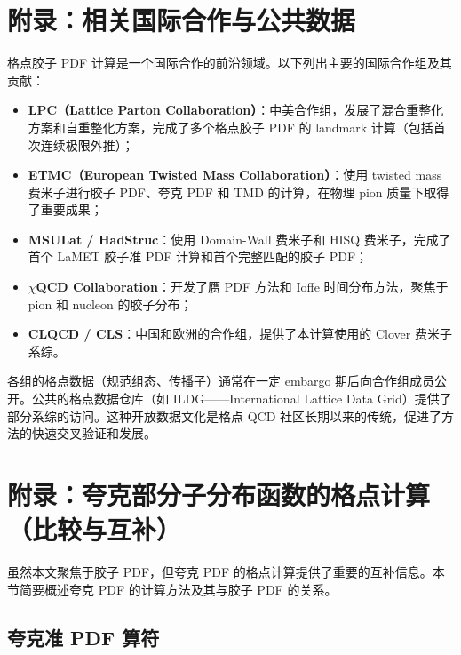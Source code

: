 \documentclass[11pt,a4paper]{ctexart}
\begin{document}
\section{附录：相关国际合作与公共数据}

格点胶子 PDF 计算是一个国际合作的前沿领域。以下列出主要的国际合作组及其贡献：

\begin{itemize}
  \item \textbf{LPC（Lattice Parton Collaboration）}：中美合作组，发展了混合重整化方案和自重整化方案，完成了多个格点胶子 PDF 的 landmark 计算（包括首次连续极限外推）；
  \item \textbf{ETMC（European Twisted Mass Collaboration）}：使用 twisted mass 费米子进行胶子 PDF、夸克 PDF 和 TMD 的计算，在物理 pion 质量下取得了重要成果；
  \item \textbf{MSULat / HadStruc}：使用 Domain-Wall 费米子和 HISQ 费米子，完成了首个 LaMET 胶子准 PDF 计算和首个完整匹配的胶子 PDF；
  \item \textbf{$\chi$QCD Collaboration}：开发了赝 PDF 方法和 Ioffe 时间分布方法，聚焦于 pion 和 nucleon 的胶子分布；
  \item \textbf{CLQCD / CLS}：中国和欧洲的合作组，提供了本计算使用的 Clover 费米子系综。
\end{itemize}

各组的格点数据（规范组态、传播子）通常在一定 embargo 期后向合作组成员公开。公共的格点数据仓库（如 ILDG——International Lattice Data Grid）提供了部分系综的访问。这种开放数据文化是格点 QCD 社区长期以来的传统，促进了方法的快速交叉验证和发展。

\section{附录：夸克部分子分布函数的格点计算（比较与互补）}

虽然本文聚焦于胶子 PDF，但夸克 PDF 的格点计算提供了重要的互补信息。本节简要概述夸克 PDF 的计算方法及其与胶子 PDF 的关系。

\subsection{夸克准 PDF 算符}
\end{document}
